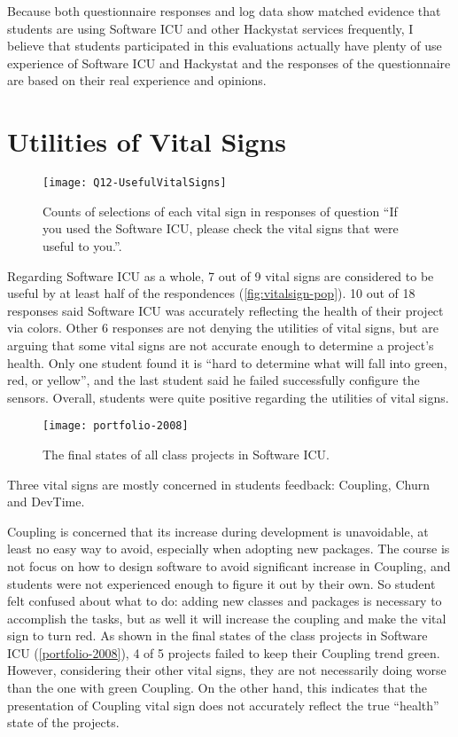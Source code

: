 Because both questionnaire responses and log data show matched evidence that students are using Software ICU and other Hackystat services frequently, I believe that students participated in this evaluations actually have plenty of use experience of Software ICU and Hackystat and the responses of the questionnaire are based on their real experience and opinions. 

\section{Utilities of Vital Signs}

\begin{figure}[htbp] %
   \centering
   \texttt{[image: Q12-UsefulVitalSigns]} 
   \caption[Vital sign popularity from survey]{Counts of selections of each vital sign in responses of question ``If you used the Software ICU, please check the vital signs that were useful to you.''.}
   \label{fig:vitalsign-pop}
\end{figure}

Regarding Software ICU as a whole, 7 out of 9 vital signs are considered to be useful by at least half of the respondences (\autoref{fig:vitalsign-pop}). 10 out of 18 responses said Software ICU was accurately reflecting the health of their project via colors. Other 6 responses are not denying the utilities of vital signs, but are arguing that some vital signs are not accurate enough to determine a project's health. Only one student found it is ``hard to determine what will fall into green, red, or yellow'', and the last student said he failed successfully configure the sensors. Overall, students were quite positive regarding the utilities of vital signs.

\begin{figure}[htbp] %
   \centering
   \texttt{[image: portfolio-2008]} 
   \caption{The final states of all class projects in Software ICU.}
   \label{fig:portfolio-2008}
\end{figure}

Three vital signs are mostly concerned in students feedback: Coupling, Churn and DevTime.

Coupling is concerned that its increase during development is unavoidable, at least no easy way to avoid, especially when adopting new packages. The course is not focus on how to design software to avoid significant increase in Coupling, and students were not experienced enough to figure it out by their own. So student felt confused about what to do: adding new classes and packages is necessary to accomplish the tasks, but as well it will increase the coupling and make the vital sign to turn red. As shown in the final states of the class projects in Software ICU (\autoref{portfolio-2008}), 4 of 5 projects failed to keep their Coupling trend green. However, considering their other vital signs, they are not necessarily doing worse than the one with green Coupling. On the other hand, this indicates that the presentation of Coupling vital sign does not accurately reflect the true ``health'' state of the projects.  

